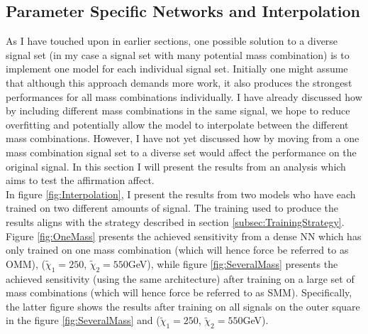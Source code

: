 \subsection{Parameter Specific Networks and Interpolation}
As I have touched upon in earlier sections, one possible solution to a diverse signal set (in my case a signal set with many 
potential mass combination) is to implement one model for each individual signal set. Initially one might assume that although 
this approach demands more work, it also produces the strongest performances for all mass combinations individually. I have already 
discussed how by including different mass combinations in the same signal, we hope to reduce overfitting and potentially allow 
the model to interpolate between the different mass combinations. However, I have not yet discussed how by moving from a one 
mass combination signal set to a diverse set would affect the performance on the original signal. In this section I will present the 
results from an analysis which aims to test the affirmation affect.
\\
In figure \ref{fig:Interpolation}, I present the results from two models who have each trained on two different amounts of signal.
The training used to produce the results aligns with the strategy described in section \ref{subsec:TrainingStrategy}.
Figure \ref{fig:OneMass} presents the achieved sensitivity from a dense \ac{NN} which has only trained on one mass combination (which will 
hence force be referred to as \ac{OMM}), ($\tilde{\chi}_1=250$, $\tilde{\chi}_2=550$GeV), while figure \ref{fig:SeveralMass} presents the 
achieved sensitivity (using the same architecture) after training on a large set of mass combinations (which will hence force be referred 
to as \ac{SMM}). Specifically, the latter figure shows the results after training on all signals on the outer square in the figure \ref{fig:SeveralMass} and 
($\tilde{\chi}_1=250$, $\tilde{\chi}_2=550$GeV).\\
